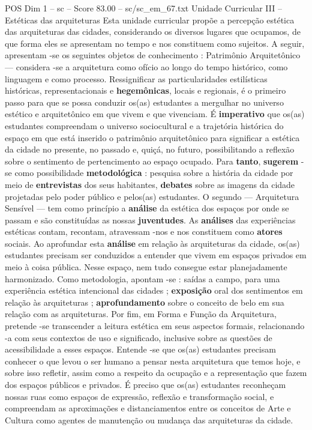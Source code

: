 \begin{textsample}{POS Dim 1 – sc – Score 83.00 – sc/sc\_em\_67.txt}
Unidade Curricular III – Estéticas das arquiteturas Esta unidade curricular propõe a percepção estética das arquiteturas das cidades, considerando os diversos lugares que ocupamos, de que forma eles se apresentam no tempo e nos constituem como sujeitos.
A seguir, apresentam -se os seguintes objetos de conhecimento : Patrimônio Arquitetônico — considera -se a arquitetura como ofício ao longo do tempo histórico, como linguagem e como processo.
Ressignificar as particularidades estilísticas históricas, representacionais e \textbf{hegemônicas}, locais e regionais, é o primeiro passo para que se possa conduzir os(as) estudantes a mergulhar no universo estético e arquitetônico em que vivem e que vivenciam.
É \textbf{imperativo} que os(as) estudantes compreendam o universo sociocultural e a trajetória histórica do espaço em que está inserido o patrimônio arquitetônico para significar a estética da cidade no presente, no passado e, quiçá, no futuro, possibilitando a reflexão sobre o sentimento de pertencimento ao espaço ocupado.
Para \textbf{tanto}, \textbf{sugerem} -se como possibilidade \textbf{metodológica} : pesquisa sobre a história da cidade por meio de \textbf{entrevistas} dos seus habitantes, \textbf{debates} sobre as imagens da cidade projetadas pelo poder público e pelos(as) estudantes.
O segundo — Arquitetura Sensível — tem como princípio a \textbf{análise} da estética dos espaços por onde se passam e são constituídas as nossas \textbf{juventudes}.
As \textbf{análises} das experiências estéticas contam, recontam, atravessam -nos e nos constituem como \textbf{atores} sociais.
Ao aprofundar esta \textbf{análise} em relação às arquiteturas da cidade, os(as) estudantes precisam ser conduzidos a entender que vivem em espaços privados em meio à coisa pública.
Nesse espaço, nem tudo consegue estar planejadamente harmonizado.
Como metodologia, apontam -se : saídas a campo, para uma experiência estética intencional das cidades ; \textbf{exposição} oral dos sentimentos em relação às arquiteturas ; \textbf{aprofundamento} sobre o conceito de belo em sua relação com as arquiteturas.
Por fim, em Forma e Função da Arquitetura, pretende -se transcender a leitura estética em seus aspectos formais, relacionando -a com seus contextos de uso e significado, inclusive sobre as questões de acessibilidade a esses espaços.
Entende -se que os(as) estudantes precisam conhecer o que levou o ser humano a pensar nesta arquitetura que temos hoje, e sobre isso refletir, assim como a respeito da ocupação e a representação que fazem dos espaços públicos e privados.
É preciso que os(as) estudantes reconheçam nossas ruas como espaços de expressão, reflexão e transformação social, e compreendam as aproximações e distanciamentos entre os conceitos de Arte e Cultura como agentes de manutenção ou mudança das arquiteturas da cidade.

\end{textsample}
